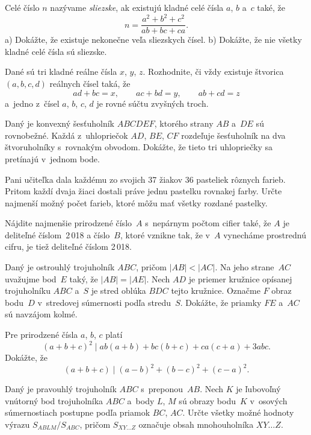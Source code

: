 {%
Celé číslo $n$ nazývame {\it sliezske}, ak existujú kladné celé čísla $a$, $b$ a~$c$ také, že
$$
n=\frac {a^2 + b^2 + c^2}{ab + bc + ca}.
$$
\ite a) Dokážte, že existuje nekonečne veľa sliezskych čísel.
\ite b) Dokážte, že nie všetky kladné celé čísla sú sliezske.
}

{%
Dané sú tri kladné reálne čísla $x$, $y$, $z$. Rozhodnite, či vždy existuje štvorica $(a,b,c,d)$ reálnych čísel taká, že
$$
ad+bc=x,\qquad ac+bd=y,\qquad ab+cd=z
$$
a~jedno z~čísel $a$, $b$, $c$, $d$ je rovné súčtu zvyšných troch.}

{%
Daný je konvexný šesťuholník $ABCDEF$, ktorého strany $AB$ a~$DE$ sú rovnobežné. Každá z~uhlopriečok $AD$, $BE$, $CF$ rozdeľuje šesťuholník na dva štvoruholníky s~rovnakým obvodom. Dokážte, že tieto tri uhlopriečky sa pretínajú v~jednom bode.
}

{%
Pani učiteľka dala každému zo svojich 37 žiakov 36 pasteliek rôznych farieb. Pritom každí dvaja žiaci dostali práve jednu pastelku rovnakej farby. Určte najmenší možný počet farieb, ktoré môžu mať všetky rozdané pastelky.
}

{%
Nájdite najmenšie prirodzené číslo~$A$ s~nepárnym počtom cifier také, že $A$ je deliteľné číslom~2\,018 a číslo~$B$, ktoré vznikne tak, že v~$A$ vynecháme prostrednú cifru, je tiež deliteľné číslom 2\,018.
}

{%
Daný je ostrouhlý trojuholník $ABC$, pričom $|AB| < |AC|$. Na jeho strane~$AC$ uvažujme bod~$E$ taký, že $|AB| = |AE|$. Nech $AD$ je priemer kružnice opísanej trojuholníku $ABC$ a~$S$ je stred oblúka $BDC$ tejto kružnice. Označme $F$ obraz bodu~$D$ v~stredovej súmernosti podľa stredu~$S$. Dokážte, že priamky $FE$ a~$AC$ sú navzájom kolmé.
}

{%
Pre prirodzené čísla $a$, $b$, $c$ platí
$$
(a+b+c)^2\mid ab(a+b)+bc(b+c)+ca(c+a)+3abc.
$$
Dokážte, že
$$
(a+b+c)\mid (a-b)^2+(b-c)^2+(c-a)^2.
$$
}

{%
Daný je pravouhlý trojuholník $ABC$ s~preponou~$AB$. Nech $K$ je ľubovoľný vnútorný bod trojuholníka $ABC$ a~body $L$, $M$ sú obrazy bodu~$K$ v~osových súmernostiach postupne podľa priamok $BC$, $AC$. Určte všetky možné hodnoty výrazu $S_{ABLM}/S_{ABC}$, pričom $S_{XY\!\dots{}Z}$ označuje obsah mnohouholníka $XY\!\dots{}Z$.
}

